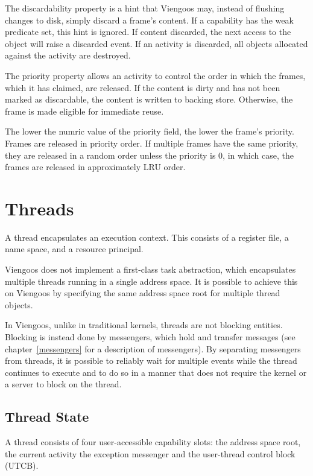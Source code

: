 The discardability property is a hint that Viengoos may, instead of
flushing changes to disk, simply discard a frame's content.  If a
capability has the weak predicate set, this hint is ignored.  If
content discarded, the next access to the object will raise a
discarded event.  If an activity is discarded, all objects allocated
against the activity are destroyed.

The priority property allows an activity to control the order in which
the frames, which it has claimed, are released.  If the content is
dirty and has not been marked as discardable, the content is written
to backing store.  Otherwise, the frame is made eligible for immediate
reuse.

The lower the numric value of the priority field, the lower the
frame's priority.  Frames are released in priority order.  If multiple
frames have the same priority, they are released in a random order
unless the priority is 0, in which case, the frames are released in
approximately LRU order.


\chapter{Threads}

A thread encapsulates an execution context.  This consists of a
register file, a name space, and a resource principal.

Viengoos does not implement a first-class task abstraction, which
encapsulates multiple threads running in a single address space.  It
is possible to achieve this on Viengoos by specifying the same address
space root for multiple thread objects.

In Viengoos, unlike in traditional kernels, threads are not blocking
entities.  Blocking is instead done by messengers, which hold and
transfer messages (see chapter~\ref{messengers} for a description of
messengers).  By separating messengers from threads, it is possible to
reliably wait for multiple events while the thread continues to
execute and to do so in a manner that does not require the kernel or a
server to block on the thread.

\section{Thread State}

A thread consists of four user-accessible capability slots: the
address space root, the current activity the exception messenger and
the user-thread control block (UTCB).

